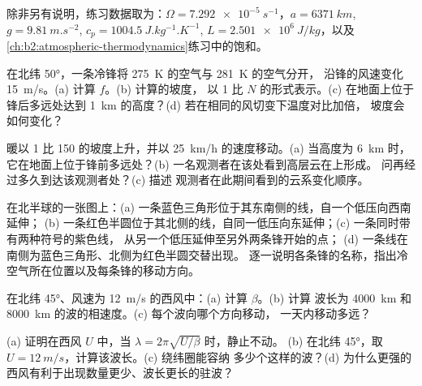 除非另有说明，练习数据取为：$\Omega = \qty{7.292e-5}{s^{-1}}$，$a =
\qty{6371}{km}$, $g = \qty{9.81}{m.s^{-2}}$, $c_p = \qty{1004.5}{J.kg^{-1}.K^{-1}}$, $L =
\qty{2.501e6}{J/kg}$，以及
\cref{ch:b2:atmospheric-thermodynamics}练习中的饱和。

\begin{exercise}[$\star$]\label{exo:b2:weather-systems:1}
在北纬 \ang{50}，一条冷锋将 \qty{275}{K} 的空气与 \qty{281}{K} 的空气分开，
沿锋的风速变化 \qty{15}{m/s}。(a) 计算 $f$。(b) 计算的坡度，
以 1 比 $N$ 的形式表示。(c) 在地面上位于锋后多远处达到
\qty{1}{km} 的高度？(d) 若在相同的风切变下温度对比加倍，
坡度会如何变化？
\end{exercise}

\begin{exercise}[$\star$]\label{exo:b2:weather-systems:2}
暖以 1 比 150 的坡度上升，并以 \qty{25}{km/h} 的速度移动。(a) 当高度为 \qty{6}{km} 时，
它在地面上位于锋前多远处？(b) 一名观测者在该处看到高层云在上形成。
问再经过多久到达该观测者处？(c) 描述
观测者在此期间看到的云系变化顺序。
\end{exercise}

\begin{exercise}[$\star$]\label{exo:b2:weather-systems:3}
在北半球的一张图上：(a) 一条蓝色三角形位于其东南侧的线，自一个低压向西南延伸；
(b) 一条红色半圆位于其北侧的线，自同一低压向东延伸；(c) 一条同时带有两种符号的紫色线，
从另一个低压延伸至另外两条锋开始的点；
(d) 一条线在南侧为蓝色三角形、北侧为红色半圆交替出现。
逐一说明各条锋的名称，指出冷空气所在位置以及每条锋的移动方向。
\end{exercise}

\begin{exercise}[$\star$]\label{exo:b2:weather-systems:4}
在北纬 \ang{45}、风速为 \qty{12}{m/s} 的西风中：(a) 计算 $\beta$。(b) 计算
波长为 \qty{4000}{km} 和 \qty{8000}{km} 的波的相速度。(c) 每个波向哪个方向移动，
一天内移动多远？
\end{exercise}

\begin{exercise}[$\star\star$]\label{exo:b2:weather-systems:5}
(a) 证明在西风 $U$ 中，当 $\lambda = 2\pi\sqrt{U/\beta}$ 时，静止不动。
(b) 在北纬 \ang{45}，取 $U = \qty{12}{m/s}$，计算该波长。(c) 绕纬圈能容纳
多少个这样的波？(d) 为什么更强的西风有利于出现数量更少、波长更长的驻波？
\end{exercise}

